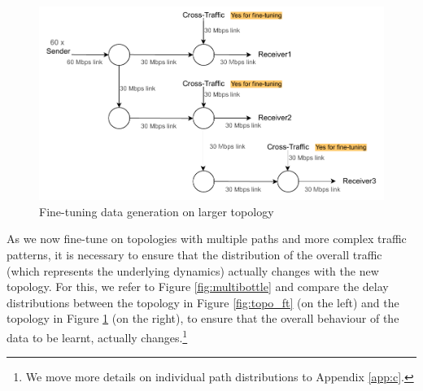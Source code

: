 \begin{figure}[h]
  \begin{center}
    \includegraphics[scale=0.8]{figures/complex_topo.pdf}
    \caption{Fine-tuning data generation on larger topology}
    \label{fig:topo_ft_big}
  \end{center}
\end{figure}

As we now fine-tune on topologies with multiple paths and more complex traffic patterns, it is necessary to ensure that the distribution of the overall traffic (which represents the underlying dynamics) actually changes with the new topology. For this, we refer to Figure \ref{fig:multibottle} and compare the delay distributions between the topology in Figure \ref{fig:topo_ft} (on the left) and the topology in Figure \ref{fig:topo_ft_big} (on the right), to ensure that the overall behaviour of the data to be learnt, actually changes.\footnote{We move more details on individual path distributions to Appendix \ref{app:c}.} 

